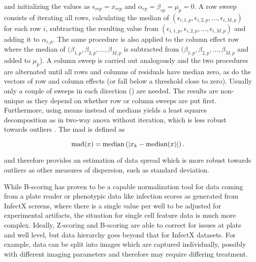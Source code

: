 and initializing the values as $\epsilon_{rcp} = x_{rcp}$ and $\alpha_{rp} = \beta_{cp} = \mu_p = 0$. A row sweep consists of iterating all rows, calculating the median of $(\epsilon_{i,1,p}, \epsilon_{i,2,p}, \dotsc, \epsilon_{i,M,p})$ for each row $i$, subtracting the resulting value from $(\epsilon_{i,1,p}, \epsilon_{i,2,p}, \dotsc, \epsilon_{i,M,p})$ and adding it to $\alpha_{i,p}$. The same procedure is also applied to the column effect row where the median of $(\beta_{1,p}, \beta_{2,p}, \dotsc, \beta_{M,p}$ is subtracted from $(\beta_{1,p}, \beta_{2,p}, \dotsc, \beta_{M,p}$ and added to $\mu_p$). A column sweep is carried out analogously and the two procedures are alternated until all rows and columns of residuals have median zero, as do the vectors of row and column effects (or fall below a threshold close to zero). Usually only a couple of sweeps in each direction () are needed. The results are non-unique as they depend on whether row or column sweeps are put first. Furthermore, using means instead of medians yields a least squares decomposition as in two-way \gls{anova} without iteration, which is less robust towards outliers \citep{Brown2004,Venables2002}. The \gls{mad} is defined as

\begin{equation}
  \operatorname{mad}(x) = \operatorname{median}\left(\lvert x_k-\operatorname{median}(x)\rvert\right).
\end{equation}

and therefore provides an estimation of data spread which is more robust towards outliers as other measures of dispersion, such as standard deviation.

While B-scoring has proven to be a capable normalization tool for data coming from a plate reader or phenotypic data like infection scores as generated from InfectX screens, where there is a single value per well to be adjusted for experimental artifacts, the situation for single cell feature data is much more complex. Ideally, Z-scoring and B-scoring are able to correct for issues at plate and well level, but data hierarchy goes beyond that for InfectX datasets. For example, data can be split into images which are captured individually, possibly with different imaging parameters and therefore may require differing treatment.

